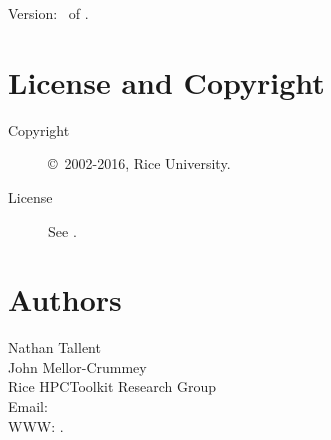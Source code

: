\documentclass[english]{article}
\begin{document}
Version: \Version\ of \Date.

\section{License and Copyright}

\begin{description}
\item[Copyright] \copyright\ 2002-2016, Rice University.
\item[License] See .
\end{description}

\section{Authors}

\noindent
Nathan Tallent \\
John Mellor-Crummey \\
Rice HPCToolkit Research Group \\
Email:  \\
WWW: .

\LatexManEnd
\end{document}
